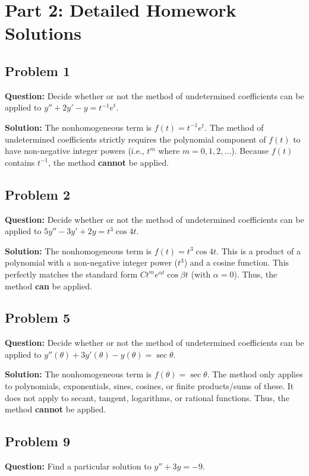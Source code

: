\documentclass[12pt]{article}
\begin{document}
\newpage
\section{Part 2: Detailed Homework Solutions}

\subsection{Problem 1}
\textbf{Question:} Decide whether or not the method of undetermined coefficients can be applied to $y'' + 2y' - y = t^{-1} e^t$.

\textbf{Solution:}
The nonhomogeneous term is $f(t) = t^{-1} e^t$. The method of undetermined coefficients strictly requires the polynomial component of $f(t)$ to have non-negative integer powers (i.e., $t^m$ where $m = 0, 1, 2, \dots$). Because $f(t)$ contains $t^{-1}$, the method \textbf{cannot} be applied.

\subsection{Problem 2}
\textbf{Question:} Decide whether or not the method of undetermined coefficients can be applied to $5y'' - 3y' + 2y = t^3 \cos 4t$.

\textbf{Solution:}
The nonhomogeneous term is $f(t) = t^3 \cos 4t$. This is a product of a polynomial with a non-negative integer power ($t^3$) and a cosine function. This perfectly matches the standard form $C t^m e^{\alpha t} \cos \beta t$ (with $\alpha = 0$). Thus, the method \textbf{can} be applied.

\subsection{Problem 5}
\textbf{Question:} Decide whether or not the method of undetermined coefficients can be applied to $y''(\theta) + 3y'(\theta) - y(\theta) = \sec \theta$.

\textbf{Solution:}
The nonhomogeneous term is $f(\theta) = \sec \theta$. The method only applies to polynomials, exponentials, sines, cosines, or finite products/sums of these. It does not apply to secant, tangent, logarithms, or rational functions. Thus, the method \textbf{cannot} be applied.

\subsection{Problem 9}
\textbf{Question:} Find a particular solution to $y'' + 3y = -9$.
\end{document}
